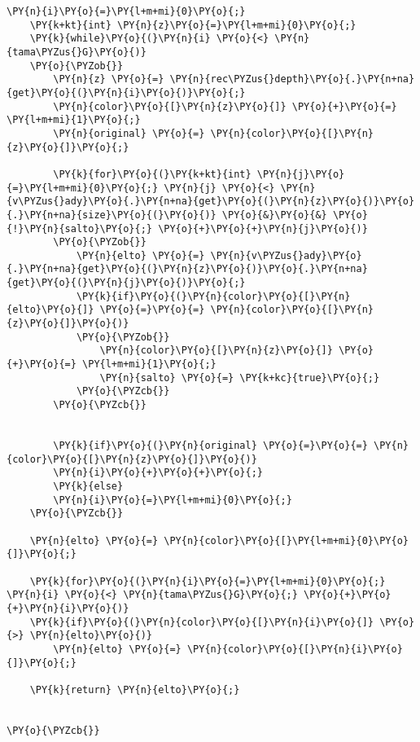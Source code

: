 \begin{Verbatim}[commandchars=\\\{\}]
    \PY{n}{i}\PY{o}{=}\PY{l+m+mi}{0}\PY{o}{;}
    \PY{k+kt}{int} \PY{n}{z}\PY{o}{=}\PY{l+m+mi}{0}\PY{o}{;}
    \PY{k}{while}\PY{o}{(}\PY{n}{i} \PY{o}{<} \PY{n}{tama\PYZus{}G}\PY{o}{)}
	\PY{o}{\PYZob{}}
	    \PY{n}{z} \PY{o}{=} \PY{n}{rec\PYZus{}depth}\PY{o}{.}\PY{n+na}{get}\PY{o}{(}\PY{n}{i}\PY{o}{)}\PY{o}{;}
	    \PY{n}{color}\PY{o}{[}\PY{n}{z}\PY{o}{]} \PY{o}{+}\PY{o}{=} \PY{l+m+mi}{1}\PY{o}{;}
	    \PY{n}{original} \PY{o}{=} \PY{n}{color}\PY{o}{[}\PY{n}{z}\PY{o}{]}\PY{o}{;}

	    \PY{k}{for}\PY{o}{(}\PY{k+kt}{int} \PY{n}{j}\PY{o}{=}\PY{l+m+mi}{0}\PY{o}{;} \PY{n}{j} \PY{o}{<} \PY{n}{v\PYZus{}ady}\PY{o}{.}\PY{n+na}{get}\PY{o}{(}\PY{n}{z}\PY{o}{)}\PY{o}{.}\PY{n+na}{size}\PY{o}{(}\PY{o}{)} \PY{o}{&}\PY{o}{&} \PY{o}{!}\PY{n}{salto}\PY{o}{;} \PY{o}{+}\PY{o}{+}\PY{n}{j}\PY{o}{)}
		\PY{o}{\PYZob{}}
		    \PY{n}{elto} \PY{o}{=} \PY{n}{v\PYZus{}ady}\PY{o}{.}\PY{n+na}{get}\PY{o}{(}\PY{n}{z}\PY{o}{)}\PY{o}{.}\PY{n+na}{get}\PY{o}{(}\PY{n}{j}\PY{o}{)}\PY{o}{;}
		    \PY{k}{if}\PY{o}{(}\PY{n}{color}\PY{o}{[}\PY{n}{elto}\PY{o}{]} \PY{o}{=}\PY{o}{=} \PY{n}{color}\PY{o}{[}\PY{n}{z}\PY{o}{]}\PY{o}{)}
			\PY{o}{\PYZob{}}
			    \PY{n}{color}\PY{o}{[}\PY{n}{z}\PY{o}{]} \PY{o}{+}\PY{o}{=} \PY{l+m+mi}{1}\PY{o}{;}
			    \PY{n}{salto} \PY{o}{=} \PY{k+kc}{true}\PY{o}{;}
			\PY{o}{\PYZcb{}}
		\PY{o}{\PYZcb{}}

       
	    \PY{k}{if}\PY{o}{(}\PY{n}{original} \PY{o}{=}\PY{o}{=} \PY{n}{color}\PY{o}{[}\PY{n}{z}\PY{o}{]}\PY{o}{)}
		\PY{n}{i}\PY{o}{+}\PY{o}{+}\PY{o}{;}
	    \PY{k}{else}
		\PY{n}{i}\PY{o}{=}\PY{l+m+mi}{0}\PY{o}{;}
	\PY{o}{\PYZcb{}} 

    \PY{n}{elto} \PY{o}{=} \PY{n}{color}\PY{o}{[}\PY{l+m+mi}{0}\PY{o}{]}\PY{o}{;}
	
    \PY{k}{for}\PY{o}{(}\PY{n}{i}\PY{o}{=}\PY{l+m+mi}{0}\PY{o}{;} \PY{n}{i} \PY{o}{<} \PY{n}{tama\PYZus{}G}\PY{o}{;} \PY{o}{+}\PY{o}{+}\PY{n}{i}\PY{o}{)}
	\PY{k}{if}\PY{o}{(}\PY{n}{color}\PY{o}{[}\PY{n}{i}\PY{o}{]} \PY{o}{>} \PY{n}{elto}\PY{o}{)}
	    \PY{n}{elto} \PY{o}{=} \PY{n}{color}\PY{o}{[}\PY{n}{i}\PY{o}{]}\PY{o}{;}

    \PY{k}{return} \PY{n}{elto}\PY{o}{;}

	
\PY{o}{\PYZcb{}}
\end{Verbatim}
